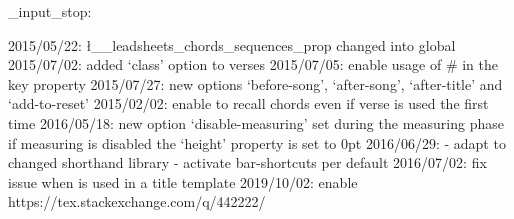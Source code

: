\file_input_stop:

2015/05/22: \l__leadsheets_chords_sequences_prop changed into global
2015/07/02: added `class' option to verses
2015/07/05: enable usage of # in the key property
2015/07/27: new options `before-song', `after-song', `after-title' and
            `add-to-reset'
2015/02/02: enable to recall chords even if verse is used the first time
2016/05/18: new option `disable-measuring'
            set \@fileswfalse during the measuring phase
            if measuring is disabled the `height' property is set to 0pt
2016/06/29: - adapt to changed shorthand library
            - activate bar-shortcuts per default
2016/07/02: fix issue when \capo is used in a title template
2019/10/02: enable https://tex.stackexchange.com/q/442222/
